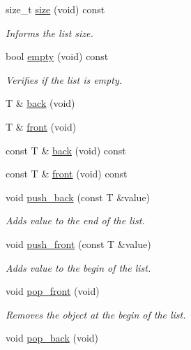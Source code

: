 \begin{DoxyCompactItemize}
\item 
size\+\_\+t \hyperlink{classls_1_1list_aa020ac837da9a86c1ee2562d868e3629}{size} (void) const 
\begin{DoxyCompactList}\small\item\em Informs the list size. \end{DoxyCompactList}\item 
bool \hyperlink{classls_1_1list_ac31acbc03e3b98a84211d76d20ec852b}{empty} (void) const 
\begin{DoxyCompactList}\small\item\em Verifies if the list is empty. \end{DoxyCompactList}\item 
T \& \hyperlink{classls_1_1list_a000b6c878e0ae734f7435c5a1acdc81f}{back} (void)
\item 
T \& \hyperlink{classls_1_1list_a157989423526cfa7550d1c067c8b03cb}{front} (void)
\item 
const T \& \hyperlink{classls_1_1list_a7d9de24b69f164f02cb0f559a6f4f7ac}{back} (void) const 
\item 
const T \& \hyperlink{classls_1_1list_a2ac5867e19e0ae516d68e57b2c8ed698}{front} (void) const 
\item 
void \hyperlink{classls_1_1list_a21438e1be5b2143896ee8480cb2beb18}{push\+\_\+back} (const T \&value)
\begin{DoxyCompactList}\small\item\em Adds value to the end of the list. \end{DoxyCompactList}\item 
void \hyperlink{classls_1_1list_a3ae27bac754d4ca95da34c9040f33d48}{push\+\_\+front} (const T \&value)
\begin{DoxyCompactList}\small\item\em Adds value to the begin of the list. \end{DoxyCompactList}\item 
void \hyperlink{classls_1_1list_a22874075ed4344dc66f881a18704d8f2}{pop\+\_\+front} (void)\hypertarget{classls_1_1list_a22874075ed4344dc66f881a18704d8f2}{}\label{classls_1_1list_a22874075ed4344dc66f881a18704d8f2}

\begin{DoxyCompactList}\small\item\em Removes the object at the begin of the list. \end{DoxyCompactList}\item 
void \hyperlink{classls_1_1list_a412e79242cc2ad3d49fc35b55e611ce2}{pop\+\_\+back} (void)\hypertarget{classls_1_1list_a412e79242cc2ad3d49fc35b55e611ce2}{}\label{classls_1_1list_a412e79242cc2ad3d49fc35b55e611ce2}


\end{DoxyCompactItemize}
